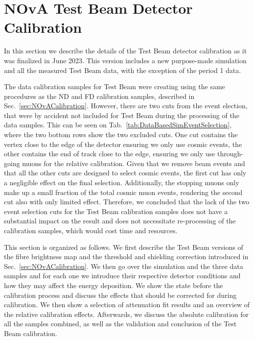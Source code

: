 
\section{NOvA Test Beam Detector Calibration}
In this section we describe the details of the Test Beam detector calibration as it was finalized in June 2023. This version includes a new purpose-made simulation and all the measured Test Beam data, with the exception of the period 1 data.

The data calibration samples for Test Beam were creating using the same procedures as the \gls{ND} and \gls{FD} calibration samples, described in Sec.~\ref{sec:NOvACalibration}. However, there are two cuts from the event election, that were by accident not included for Test Beam during the processing of the data samples. This can be seen on Tab.~\ref{tab:DataBasedSimEventSelection}, where the two bottom rows show the two excluded cuts. One cut contains the vertex close to the edge of the detector ensuring we only use cosmic events, the other contains the end of track close to the edge, ensuring we only use through-going muons for the relative calibration. Given that we remove beam events and that all the other cuts are designed to select cosmic events, the first cut has only a negligible effect on the final selection. Additionally, the stopping muons only make up a small fraction of the total cosmic muon events, rendering the second cut also with only limited effect. Therefore, we concluded that the lack of the two event selection cuts for the Test Beam calibration samples does not have a substantial impact on the result and does not necessitate re-processing of the calibration samples, which would cost time and resources.

This section is organized as follows. We first describe the Test Beam versions of the fibre brightness map and the threshold and shielding correction introduced in Sec.~\ref{sec:NOvACalibration}. We then go over the simulation and the three data samples and for each one we introduce their respective detector conditions and how they may affect the energy deposition. We show the state before the calibration process and discuss the effects that should be corrected for during calibration. We then show a selection of attenuation fit results and an overview of the relative calibration effects. Afterwards, we discuss the absolute calibration for all the samples combined, as well as the validation and conclusion of the Test Beam calibration.

